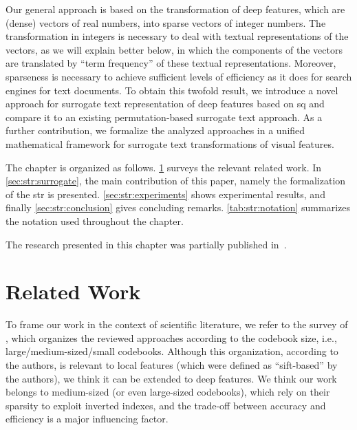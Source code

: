 Our general approach is based on the transformation of deep features, which are (dense) vectors of real numbers, into sparse vectors of integer numbers.
The transformation in integers is necessary to deal with textual representations of the vectors, as we will explain better below, in which the components of the vectors are translated by ``term frequency'' of these textual representations.
Moreover, sparseness is necessary to achieve sufficient levels of efficiency as it does for search engines for text documents.
To obtain this twofold result, we introduce a novel approach for surrogate text representation of deep features based on \acrfull{sq} and compare it to an existing permutation-based surrogate text approach.
As a further contribution, we formalize the analyzed approaches in a unified mathematical framework for surrogate text transformations of visual features.


The chapter is organized as follows.
\ref{sec:str:related-work} surveys the relevant related work.
In \ref{sec:str:surrogate}, the main contribution of this paper, namely the formalization of the \acrfull{str} is presented.
\ref{sec:str:experiments} shows experimental results, and finally \ref{sec:str:conclusion} gives concluding remarks.
\ref{tab:str:notation} summarizes the notation used throughout the chapter.

The research presented in this chapter was partially published in~\cite{amato2017efficient,amato2018large}.

\section{Related Work}
\label{sec:str:related-work}
To frame our work in the context of scientific literature, we refer to the survey of \citet{zheng2018sift}, which organizes the reviewed approaches according to the codebook size, i.e., large/medium-sized/small codebooks.
Although this organization, according to the authors, is relevant to local features (which were defined as ``sift-based'' by the authors), we think it can be extended to deep features.
We think our work belongs to medium-sized (or even large-sized codebooks), which rely on their sparsity to exploit inverted indexes, and the trade-off between accuracy and efficiency is a major influencing factor.

